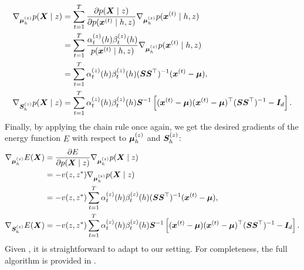 \begin{align}
    \nabla_{{\bm{\mu}}^{(z)}_h} p({\bm{X}} \mid z) &= \sum_{t=1}^T \frac{\partial p({\bm{X}} \mid z)}{\partial p({\bm{x}}^{(t)} \mid h, z)} \nabla_{{\bm{\mu}}^{(z)}_h} p({\bm{x}}^{(t)} \mid h, z) \nonumber\\
    &= \sum_{t=1}^T \frac{\alpha_{t}^{(z)}(h) \beta_{t}^{(z)}(h)}{p({\bm{x}}^{(t)} \mid h, z)} \nabla_{{\bm{\mu}}^{(z)}_h} p({\bm{x}}^{(t)} \mid h, z) \nonumber\\
    &= \sum_{t=1}^T \alpha_{t}^{(z)}(h) \beta_{t}^{(z)}(h) ({\bm{S}} {\bm{S}} ^\top)^{-1} ({\bm{x}}^{(t)} - {\bm{\mu}}), \\
    \nabla_{{\bm{S}}^{(z)}_h} p({\bm{X}} \mid z) &= \sum_{t=1}^T \alpha_{t}^{(z)}(h) \beta_{t}^{(z)}(h) {\bm{S}}^{-1} \left[ ({\bm{x}}^{(t)} - {\bm{\mu}}) ({\bm{x}}^{(t)} - {\bm{\mu}})^\top ({\bm{S}} {\bm{S}} ^\top)^{-1} - {\bm{I}}_d\right].
\end{align}
Finally, by applying the chain rule once again, we get the desired gradients of the energy function $E$ with respect to ${\bm{\mu}}^{(z)}_h$ and ${\bm{S}}^{(z)}_h$:
\begin{align}
    \nabla_{{\bm{\mu}}^{(z)}_h} E({\bm{X}}) &= \frac{\partial E}{\partial p({\bm{X}} \mid z)} \nabla_{{\bm{\mu}}^{(z)}_h} p({\bm{X}} \mid z) \nonumber\\
    &= -v(z, z^*) \nabla_{{\bm{\mu}}^{(z)}_h} p({\bm{X}} \mid z) \nonumber\\
    &= -v(z, z^*) \sum_{t=1}^T \alpha_{t}^{(z)}(h) \beta_{t}^{(z)}(h) ({\bm{S}} {\bm{S}} ^\top)^{-1} ({\bm{x}}^{(t)} - {\bm{\mu}}), \label{eq:sohmmm_grad_mu}\\
    \nabla_{{\bm{S}}^{(z)}_h} E({\bm{X}}) &= -v(z, z^*) \sum_{t=1}^T \alpha_{t}^{(z)}(h) \beta_{t}^{(z)}(h) {\bm{S}}^{-1} \left[ ({\bm{x}}^{(t)} - {\bm{\mu}}) ({\bm{x}}^{(t)} - {\bm{\mu}})^\top ({\bm{S}} {\bm{S}} ^\top)^{-1} - {\bm{I}}_d\right]. \label{eq:sohmmm_grad_s}
\end{align}
Given , it is straightforward to adapt  to our setting. For completeness, the full algorithm is provided in .

